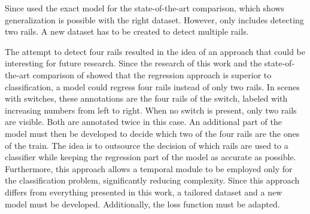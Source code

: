 Since \cite{tepNet2024} used the exact model for the state-of-the-art comparison, which shows generalization is possible with the right dataset.
However, \cite{tepNet2024} only includes detecting two rails.
A new dataset has to be created to detect multiple rails.

The attempt to detect four rails resulted in the idea of an approach that could be interesting for future research.
Since the research of this work and the state-of-the-art comparison of \cite{tepNet2024} showed that the regression approach is superior to classification, a model could regress four rails instead of only two rails.
In scenes with switches, these annotations are the four rails of the switch, labeled with increasing numbers from left to right.
When no switch is present, only two rails are visible.
Both are annotated twice in this case.
An additional part of the model must then be developed to decide which two of the four rails are the ones of the train.
The idea is to outsource the decision of which rails are used to a classifier while keeping the regression part of the model as accurate as possible.
Furthermore, this approach allows a temporal module to be employed only for the classification problem, significantly reducing complexity.
Since this approach differs from everything presented in this work, a tailored dataset and a new model must be developed.
Additionally, the loss function must be adapted.